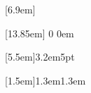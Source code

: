 \documentclass[12pt]{report}			%
\newif\ifallchapters
\begin{document}
\contentsmargin[2em]{2em}

	[6.9em]		%
	{}
	{}
	{}
	{\contentspage}	%

	[13.85em]	%
	{}		%
	{0}		%
	{0em}	%

[5.5em]{}{3.2em}{5pt}

\renewcommand{\emph}[1]{\uline{#1}}

\renewcommand{\APACciteatitle}[1]{\enquote{#1}}

\setlength\parindent{3em}

\setlength{\textfloatsep}{0.5em} 
\fi

\ifallchapters
\addtocontents{toc}{~\hfill{Page}\par}

\ifnotUCFormat
	\addtocontents{lof}{\hspace{-1.4em}Figure No.~\hfill{Page}\par}
	\addtocontents{lot}{\hspace{-1.4em}Table No.~\hfill{Page}\par}
\else
\fi

\ifnotUCFormat
\else
{}[1.5em]{}{1.3em}{1.3em}
\fi
\end{document}
